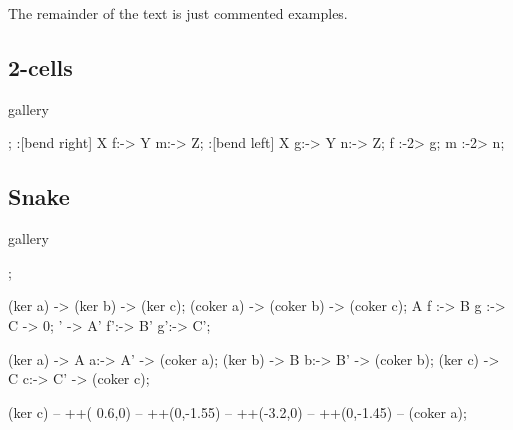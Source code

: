 
The remainder of the text is just commented examples.

\clearpage

\subsection{2-cells}

\begin{tcblisting}{gallery}


\begin{codi}
  ;
  \mor[swap]:[bend right] X f:-> Y m:-> Z;
  \mor      :[bend left]  X g:-> Y n:-> Z;
  \mor       f \alpha:-2> g;
  \mor[swap] m  \beta:-2> n;
\end{codi}
\end{tcblisting}

\subsection{Snake}

\begin{tcblisting}{gallery}
\begin{codi}[tetragonal]
  ;

  \mor   (ker a) ->   (ker b) ->   (ker c);
  \mor (coker a) -> (coker b) -> (coker c);
  \mor       A  f :-> B  g :-> C -> 0;
  ' -> A' f':-> B' g':-> C';

   (ker a) -> A a:-> A' -> (coker a);
   (ker b) -> B b:-> B' -> (coker b);
   (ker c) -> C c:-> C' -> (coker c);

  \draw[/codi/arrows/crossing over, ->, rounded corners, >=stealth]
    (ker c) -- ++( 0.6,0) -- ++(0,-1.55)
            -- ++(-3.2,0) -- ++(0,-1.45) -- (coker a);
\end{codi}
\end{tcblisting}

